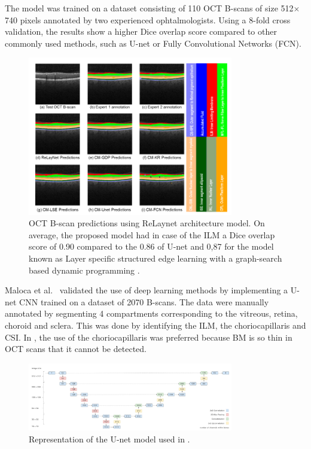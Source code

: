 \documentclass[12pt,a4paper]{scrartcl}
\begin{document}
The model was trained on a dataset consisting of 110 OCT B-scans of size 512$\times$740 pixels annotated by two experienced  ophtalmologists. Using a 8-fold cross validation, the results show a higher Dice overlap score compared to other commonly used methods, such as U-net or Fully Convolutional Networks (FCN).

\begin{figure}[H]
    \centering
    \includegraphics[width=0.8\textwidth]{./images/relaynet-predictions.png}
    \caption{OCT B-scan predictions using ReLaynet architecture model. On average, the proposed model had in case of the ILM a Dice overlap score of 0.90 compared to the 0.86 of U-net and 0,87 for the model known as Layer specific structured edge learning with a graph-search based dynamic programming  \cite{Roy2017}.}
\end{figure}

Maloca et al.~\cite{Maloca2019} validated the use of deep learning methods by implementing a U-net CNN trained on a dataset of 2070 B-scans. The data were manually annotated by segmenting 4 compartments corresponding to the vitreous, retina, choroid and sclera. This was done by identifying the ILM, the choriocapillaris and CSI. In \cite{Maloca2019}, the use of the choriocapillaris was preferred because BM is so thin in OCT scans that it cannot be detected.

\begin{figure}[H]
    \centering
    \includegraphics[width=0.8\textwidth]{./images/maloca-unet.png}
    \caption{Representation of the U-net model used in \cite{Maloca2019}.}
\end{figure}
\end{document}
